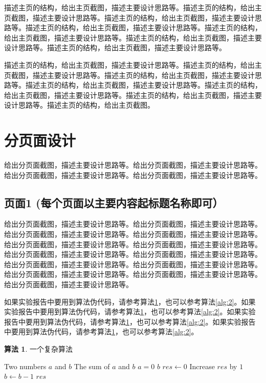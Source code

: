 \documentclass[supercite]{Experimental_Report}
\theoremstyle{definition}
\newtheorem{alg}{算法}[section]
\begin{document}
	描述主页的结构，给出主页截图，描述主要设计思路等。描述主页的结构，给出主页截图，描述主要设计思路等。描述主页的结构，给出主页截图，描述主要设计思路等。描述主页的结构，给出主页截图，描述主要设计思路等。描述主页的结构，给出主页截图，描述主要设计思路等。描述主页的结构，给出主页截图，描述主要设计思路等。描述主页的结构，给出主页截图，描述主要设计思路等。
	
	描述主页的结构，给出主页截图，描述主要设计思路等。描述主页的结构，给出主页截图，描述主要设计思路等。描述主页的结构，给出主页截图，描述主要设计思路等。描述主页的结构，给出主页截图，描述主要设计思路等。描述主页的结构，给出主页截图，描述主要设计思路等。描述主页的结构，给出主页截图，描述主要设计思路等。描述主页的结构，给出主页截图。
	
	\newpage
	
	\section{分页面设计}
	
	给出分页面截图，描述主要设计思路等。给出分页面截图，描述主要设计思路等。给出分页面截图，描述主要设计思路等。给出分页面截图，描述主要设计思路等。
	
	\subsection{页面1 (每个页面以主要内容起标题名称即可）}
	
	给出分页面截图，描述主要设计思路等。给出分页面截图，描述主要设计思路等。给出分页面截图，描述主要设计思路等。给出分页面截图，描述主要设计思路等。给出分页面截图，描述主要设计思路等。给出分页面截图，描述主要设计思路等。给出分页面截图，描述主要设计思路等。给出分页面截图，描述主要设计思路等。给出分页面截图，描述主要设计思路等。给出分页面截图，描述主要设计思路等。给出分页面截图，描述主要设计思路等。给出分页面截图，描述主要设计思路等。给出分页面截图，描述主要设计思路等。
	
	如果实验报告中要用到算法伪代码，请参考算法\ref{alg:1}，也可以参考算法\ref{alg:2}。如果实验报告中要用到算法伪代码，请参考算法\ref{alg:1}，也可以参考算法\ref{alg:2}。如果实验报告中要用到算法伪代码，请参考算法\ref{alg:1}，也可以参考算法\ref{alg:2}。如果实验报告中要用到算法伪代码，请参考算法\ref{alg:1}，也可以参考算法\ref{alg:2}。
	
	\begin{shaded*}\begin{alg}{一个复杂算法}
			\label{alg:1}
			\begin{algorithmic}
				\Input Two numbers $a$ and $b$
				\Output The sum of $a$ and $b$
				\If $a = 0$
				\State \Return $b$
				\EndIf
				\State $res \gets 0$
				\State Increase $res$ by $1$
				\State $b \gets b - 1$
				\EndWhile
				\State \Return $res$
				\EndProcedure
			\end{algorithmic}
	\end{alg}\end{shaded*}
	
\end{document}
